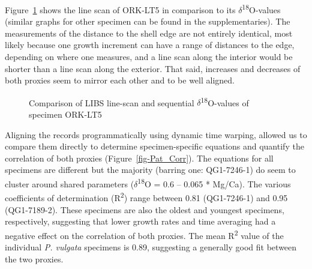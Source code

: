 \documentclass[
  authoryear,
  preprint,
  3p]{elsarticle}
\begin{document}
Figure~\ref{fig-Pat_Comp} shows the line scan of ORK-LT5 in comparison
to its \(\delta\)\textsuperscript{18}O-values (similar graphs for other
specimen can be found in the supplementaries). The measurements of the
distance to the shell edge are not entirely identical, most likely
because one growth increment can have a range of distances to the edge,
depending on where one measures, and a line scan along the interior
would be shorter than a line scan along the exterior. That said,
increases and decreases of both proxies seem to mirror each other and to
be well aligned.

\begin{figure}


\caption{\label{fig-Pat_Comp}Comparison of LIBS line-scan and sequential
\(\delta\)\textsuperscript{18}O-values of specimen ORK-LT5}

\end{figure}%

Aligning the records programmatically using dynamic time warping,
allowed us to compare them directly to determine specimen-specific
equations and quantify the correlation of both proxies
(Figure~\ref{fig-Pat_Corr}). The equations for all specimens are
different but the majority (barring one: QG1-7246-1) do seem to cluster
around shared parameters (\(\delta\)\textsuperscript{18}Ο = 0.6 -- 0.065
* Mg/Ca). The various coefficients of determination
(R\textsuperscript{2}) range between 0.81 (QG1-7246-1) and 0.95
(QG1-7189-2). These specimens are also the oldest and youngest
specimens, respectively, suggesting that lower growth rates and time
averaging had a negative effect on the correlation of both proxies. The
mean R\textsuperscript{2} value of the individual \emph{P. vulgata}
specimens is 0.89, suggesting a generally good fit between the two
proxies.
\end{document}

